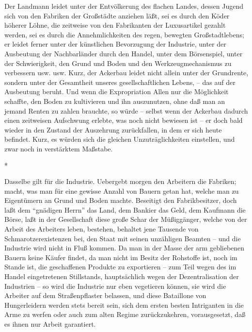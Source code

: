 \documentclass{scrbook}
\begin{document}
Der Landmann leidet unter der Entvölkerung des flachen Landes, dessen Jugend sich von den Fabriken der Großstädte anziehen läßt, sei es durch den Köder höherer Löhne, die zeitweise von den Fabrikanten der Luxusartikel gezahlt werden, sei es durch die Annehmlichkeiten des regen, bewegten Großstadtlebens; er leidet ferner unter der künstlichen Bevorzugung der Industrie, unter der Ausbeutung der Nachbarländer durch den Handel, unter dem Börsenspiel, unter der Schwierigkeit, den Grund und Boden und den Werkzeugmechanismus zu verbessern usw. usw. Kurz, der Ackerbau leidet nicht allein unter der Grundrente, sondern unter der Gesamtheit unseres gesellschaftlichen Lebens, – das auf der Ausbeutung beruht. Und wenn die Expropriation Allen nur die Möglichkeit schaffte, den Boden zu kultivieren und ihn auszunutzen, ohne daß man an jemand Renten zu zahlen brauchte, so würde – selbst wenn der Ackerbau dadurch einen zeitweisen Aufschwung erlebte, was noch nicht bewiesen ist – er doch bald wieder in den Zustand der Auszehrung zurückfallen, in dem er sich heute befindet. Kurz, es würden sich die gleichen Unzuträglichkeiten einstellen, und zwar noch in verstärktem Maßstabe.

\begin{center}*\end{center}

Dasselbe gilt für die Industrie. Uebergebt morgen den Arbeitern die Fabriken; macht, was man für eine gewisse Anzahl von Bauern getan hat, welche man zu Eigentümern an Grund und Boden machte. Beseitigt den Fabrikbesitzer, doch laßt dem ``gnädigen Herrn'' das Land, dem Bankier das Geld, dem Kaufmann die Börse, laßt in der Gesellschaft diese große Schar der Müßiggänger, welche von der Arbeit des Arbeiters leben, bestehen, behaltet jene Tausende von Schmarotzerexistenzen bei, den Staat mit seinen unzähligen Beamten – und die Industrie wird nicht in Fluß kommen. Da man in der Masse der arm gebliebenen Bauern keine Käufer findet, da man nicht im Besitz der Rohstoffe ist, noch im Stande ist, die geschaffenen Produkte zu exportieren – zum Teil wegen des im Handel eingetretenen Stillstands, hauptsächlich wegen der Dezentralisation der Industrien – so wird die Industrie nur eben vegetieren können, sie wird die Arbeiter auf dem Straßenpflaster belassen, und diese Bataillone von Hungerleidern werden stets bereit sein, sich dem ersten besten Intriganten in die Arme zu werfen oder auch zum alten Regime zurückzukehren, vorausgesetzt, daß es ihnen nur Arbeit garantiert.
\end{document}
